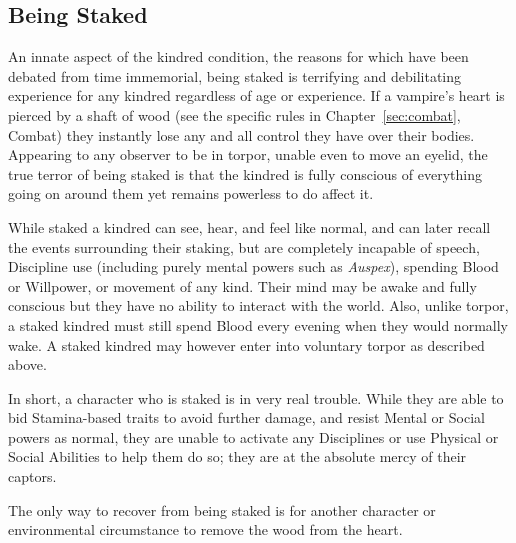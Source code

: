 \subsection{Being Staked}
An innate aspect of the kindred condition, the reasons for which have been debated 
from time immemorial, being staked is terrifying and debilitating experience 
for any kindred regardless of age or experience.  If a vampire's heart is 
pierced by a shaft of wood (see the specific rules in Chapter~\ref{sec:combat}, 
Combat) they instantly lose any and all control they have over their bodies.  
Appearing to any observer to be in torpor, unable even to move an eyelid, the 
true terror of being staked is that the kindred is fully conscious of everything 
going on around them yet remains powerless to do affect it.

While staked a kindred can see, hear, and feel like normal, and can later recall 
the events surrounding their staking, but are completely incapable of speech, 
Discipline use (including purely mental powers such as \emph{Auspex}), spending 
Blood or Willpower, or movement of any kind.  Their mind may be awake and fully 
conscious but they have no ability to interact with the world.  Also, unlike torpor, 
a staked kindred must still spend Blood every evening when they would normally wake.  
A staked kindred may however enter into voluntary torpor as described above.

In short, a character who is staked is in very real trouble.  While they are able to 
bid Stamina-based traits to avoid further damage, and resist Mental or Social powers 
as normal, they are unable to activate any Disciplines or use Physical or Social 
Abilities to help them do so; they are at the absolute mercy of their captors.

The only way to recover from being staked is for another character or environmental 
circumstance to remove the wood from the heart.
